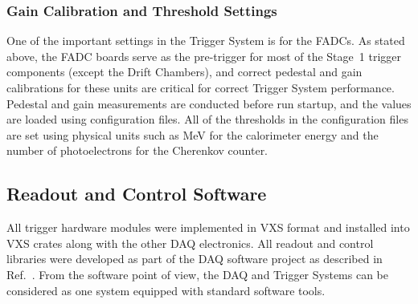 \subsubsection{Gain Calibration and Threshold Settings}

One of the important settings in the Trigger System is for the FADCs. As stated above, the FADC boards serve
as the pre-trigger for most of the Stage~1 trigger components (except the Drift Chambers), and correct
pedestal and gain calibrations for these units are critical for correct Trigger System performance. Pedestal and
gain measurements are conducted before run startup, and the values are loaded using configuration files. All of
the thresholds in the configuration files are set using physical units such as MeV for the calorimeter energy and
the number of photoelectrons for the Cherenkov counter.

\subsection{Readout and Control Software}

All trigger hardware modules were implemented in VXS format and installed into VXS crates along with the
other DAQ electronics. All readout and control libraries were developed as part of the DAQ software project
as described in Ref.~\cite{daq-ref}. From the software point of view, the DAQ and Trigger Systems can be
considered as one system equipped with standard software tools.
